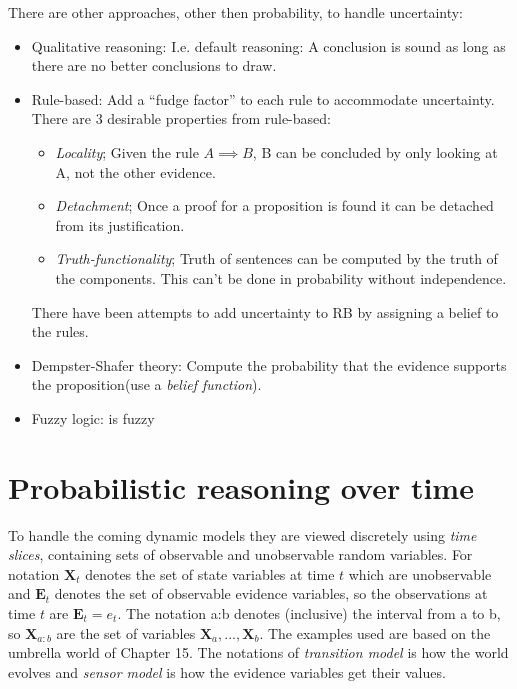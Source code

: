 \documentclass[11pt, letterpaper]{report}
\numberwithin{equation}{section}
\begin{document}
There are other approaches, other then probability, to handle uncertainty:
\begin{itemize}
\item Qualitative reasoning: I.e. default reasoning: A conclusion is sound as
  long as there are no better conclusions to draw.
\item Rule-based: Add a ``fudge factor'' to each rule to accommodate
  uncertainty. There are 3 desirable properties from rule-based:
  \begin{itemize}
  \item \emph{Locality}; Given the rule $A \implies B$, B can be concluded by
    only looking at A, not the other evidence.
  \item \emph{Detachment}; Once a proof for a proposition is found it can be
    detached from its justification.
  \item \emph{Truth-functionality}; Truth of sentences can be computed by the
    truth of the components. This can't be done in probability without independence.
  \end{itemize}
  There have been attempts to add uncertainty to RB by assigning a belief to the rules.
\item Dempster-Shafer theory: Compute the probability that the evidence supports
  the proposition(use a \emph{belief function}).
\item Fuzzy logic: is fuzzy
\end{itemize}

\section{Probabilistic reasoning over time}
To handle the coming dynamic models they are viewed discretely using \emph{time
  slices}, containing sets of observable and unobservable random variables. For
notation $\boldsymbol{X}_t$ denotes the set of state variables at time $t$ which
are unobservable and $\boldsymbol{E}_t$ denotes the set of observable evidence
variables, so the observations at time $t$ are $\boldsymbol{E}_t = e_t$. The
notation a:b denotes (inclusive) the interval from a to b, so
$\boldsymbol{X}_{a:b}$ are the set of variables
$\boldsymbol{X}_a,...,\boldsymbol{X}_b$. The examples used are based on the
umbrella world of Chapter 15. The notations of \emph{transition model} is how
the world evolves and \emph{sensor model} is how the evidence variables get
their values.
\end{document}
